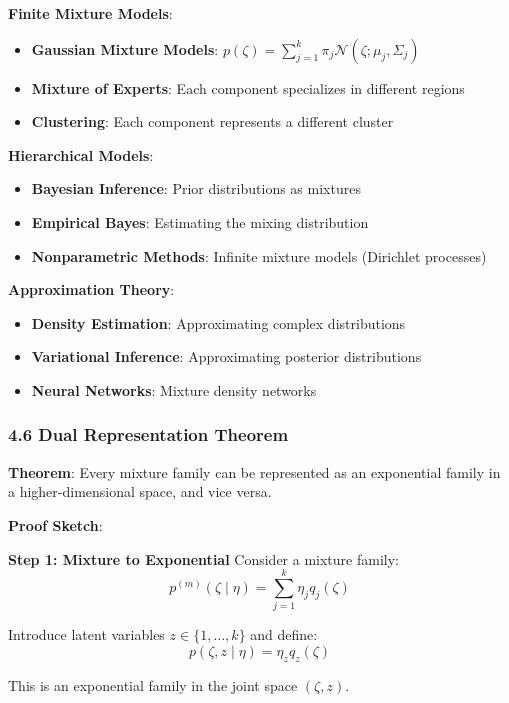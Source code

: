 \documentclass{amsart}
\theoremstyle{plain}
\theoremstyle{definition}
\theoremstyle{remark}
\begin{document}
\textbf{Finite Mixture Models}:

\begin{itemize}
	\item \textbf{Gaussian Mixture Models}: $p(\zeta) = \sum_{j=1}^k \pi_j \mathcal{N}(\zeta; \mu_j, \Sigma_j)$
	\item \textbf{Mixture of Experts}: Each component specializes in different regions
	\item \textbf{Clustering}: Each component represents a different cluster
\end{itemize}

\textbf{Hierarchical Models}:

\begin{itemize}
	\item \textbf{Bayesian Inference}: Prior distributions as mixtures
	\item \textbf{Empirical Bayes}: Estimating the mixing distribution
	\item \textbf{Nonparametric Methods}: Infinite mixture models (Dirichlet processes)
\end{itemize}

\textbf{Approximation Theory}:

\begin{itemize}
	\item \textbf{Density Estimation}: Approximating complex distributions
	\item \textbf{Variational Inference}: Approximating posterior distributions
	\item \textbf{Neural Networks}: Mixture density networks
\end{itemize}

\subsubsection{4.6 Dual Representation Theorem}

\textbf{Theorem}: Every mixture family can be represented as an exponential family in a higher-dimensional space, and vice versa.

\textbf{Proof Sketch}:

\textbf{Step 1: Mixture to Exponential}
Consider a mixture family:
\[
p^{(m)}(\zeta \mid \eta) = \sum_{j=1}^k \eta_j q_j(\zeta)
\]

Introduce latent variables $z \in \{1, \ldots, k\}$ and define:
\[
p(\zeta, z \mid \eta) = \eta_z q_z(\zeta)
\]

This is an exponential family in the joint space $(\zeta, z)$.
\end{document}
